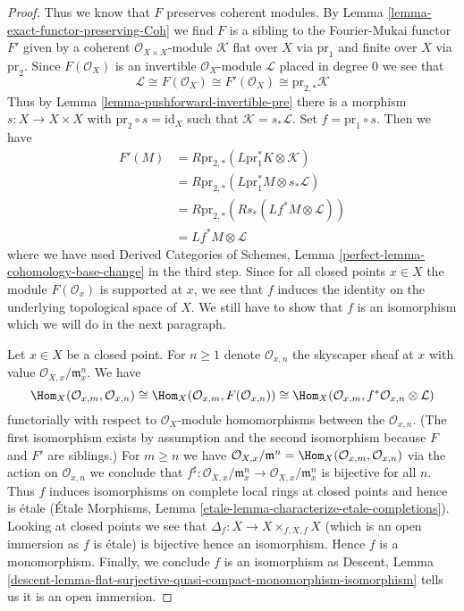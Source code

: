 \begin{proof}
\medskip\noindent
Thus we know that $F$ preserves coherent modules. By
Lemma \ref{lemma-exact-functor-preserving-Coh}
we find $F$ is a sibling to the Fourier-Mukai functor $F'$ given by
a coherent $\mathcal{O}_{X \times X}$-module $\mathcal{K}$
flat over $X$ via $\text{pr}_1$ and finite over $X$ via $\text{pr}_2$.
Since $F(\mathcal{O}_X)$ is an invertible $\mathcal{O}_X$-module
$\mathcal{L}$ placed in degree $0$ we see that
$$
\mathcal{L} \cong F(\mathcal{O}_X) \cong F'(\mathcal{O}_X) \cong
\text{pr}_{2, *}\mathcal{K}
$$
Thus by Lemma \ref{lemma-pushforward-invertible-pre} there
is a morphism $s : X \to X \times X$ with $\text{pr}_2 \circ s = \text{id}_X$
such that $\mathcal{K} = s_*\mathcal{L}$. Set $f = \text{pr}_1 \circ s$.
Then we have
\begin{align*}
F'(M)
& =
R\text{pr}_{2, *}(L\text{pr}_1^*K \otimes \mathcal{K}) \\
& =
R\text{pr}_{2, *}(L\text{pr}_1^*M \otimes s_*\mathcal{L}) \\
& =
R\text{pr}_{2, *}(Rs_*(Lf^*M \otimes \mathcal{L})) \\
& =
Lf^*M \otimes \mathcal{L}
\end{align*}
where we have used
Derived Categories of Schemes, Lemma \ref{perfect-lemma-cohomology-base-change}
in the third step.
Since for all closed points $x \in X$ the module $F(\mathcal{O}_x)$
is supported at $x$, we see that $f$ induces the identity on the
underlying topological space of $X$. We still have to show that
$f$ is an isomorphism which we will do in the next paragraph.

\medskip\noindent
Let $x \in X$ be a closed point.
For $n \geq 1$ denote $\mathcal{O}_{x, n}$ the skyscaper
sheaf at $x$ with value $\mathcal{O}_{X, x}/\mathfrak m_x^n$.
We have
$$
\Hom_X(\mathcal{O}_{x, m}, \mathcal{O}_{x, n}) \cong
\Hom_X(\mathcal{O}_{x, m}, F(\mathcal{O}_{x, n})) \cong
\Hom_X(\mathcal{O}_{x, m}, f^*\mathcal{O}_{x, n} \otimes \mathcal{L})
$$
functorially with respect to $\mathcal{O}_X$-module homomorphisms
between the $\mathcal{O}_{x, n}$. (The first isomorphism exists
by assumption and the second isomorphism because $F$ and $F'$ are siblings.)
For $m \geq n$ we have $\mathcal{O}_{X, x}/\mathfrak m^n =
\Hom_X(\mathcal{O}_{x, m}, \mathcal{O}_{x, n})$
via the action on $\mathcal{O}_{x, n}$
we conclude that $f^\sharp : \mathcal{O}_{X, x}/\mathfrak m_x^n \to
\mathcal{O}_{X, x}/\mathfrak m_x^n$ is bijective for all $n$.
Thus $f$ induces isomorphisms on complete local rings at closed
points and hence is \'etale
(\'Etale Morphisms, Lemma \ref{etale-lemma-characterize-etale-completions}).
Looking at closed points we see that
$\Delta_f : X \to X \times_{f, X, f} X$ (which is an open immersion
as $f$ is \'etale) is bijective hence an isomorphism.
Hence $f$ is a monomorphism. Finally, we conclude $f$ is an isomorphism
as Descent, Lemma
\ref{descent-lemma-flat-surjective-quasi-compact-monomorphism-isomorphism}
tells us it is an open immersion.
\end{proof}

